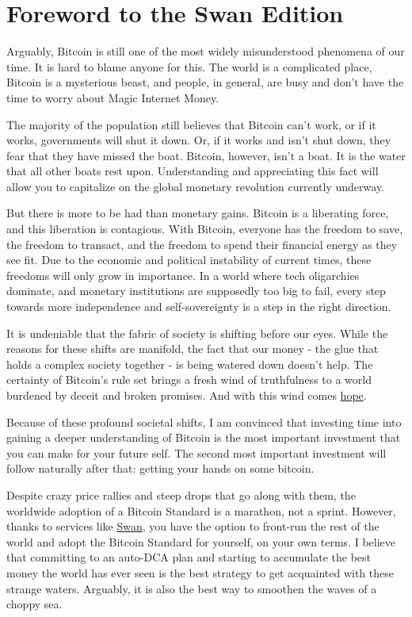 \chapter*{Foreword to the Swan Edition}

Arguably, Bitcoin is still one of the most widely misunderstood phenomena of our
time. It is hard to blame anyone for this. The world is a complicated place,
Bitcoin is a mysterious beast, and people, in general, are busy and don't have
the time to worry about Magic Internet Money.

The majority of the population still believes that Bitcoin can't work, or if it
works, governments will shut it down. Or, if it works and isn't shut down, they
fear that they have missed the boat. Bitcoin, however, isn't a boat. It is the
water that all other boats rest upon. Understanding and appreciating this fact
will allow you to capitalize on the global monetary revolution currently
underway.

But there is more to be had than monetary gains. Bitcoin is a liberating force,
and this liberation is contagious. With Bitcoin, everyone has the freedom to
save, the freedom to transact, and the freedom to spend their financial energy
as they see fit. Due to the economic and political instability of current times,
these freedoms will only grow in importance. In a world where tech oligarchies
dominate, and monetary institutions are supposedly too big to fail, every step
towards more independence and self-sovereignty is a step in the right direction.

It is undeniable that the fabric of society is shifting before our eyes. While
the reasons for these shifts are manifold, the fact that our money - the glue
that holds a complex society together - is being watered down doesn't help. The
certainty of Bitcoin's rule set brings a fresh wind of truthfulness to a world
burdened by deceit and broken promises. And with this wind comes
\href{https://hope.com}{hope}.

Because of these profound societal shifts, I am convinced that investing time
into gaining a deeper understanding of Bitcoin is the most important investment
that you can make for your future self. The second most important investment
will follow naturally after that: getting your hands on some bitcoin.

Despite crazy price rallies and steep drops that go along with them, the
worldwide adoption of a Bitcoin Standard is a marathon, not a sprint. However,
thanks to services like \href{https://swanbitcoin.com}{Swan}, you have the
option to front-run the rest of the world and adopt the Bitcoin Standard for
yourself, on your own terms. I believe that committing to an auto-DCA plan and
starting to accumulate the best money the world has ever seen is the best
strategy to get acquainted with these strange waters. Arguably, it is also the
best way to smoothen the waves of a choppy sea.


